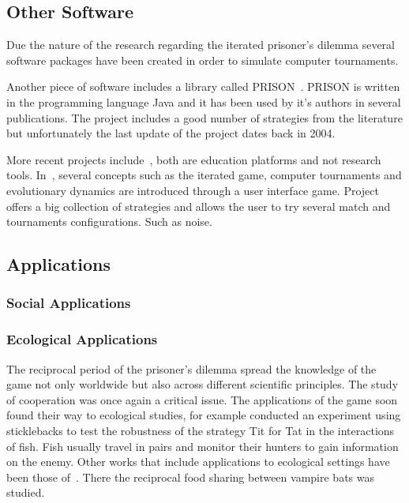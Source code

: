 \documentclass{article}
\begin{document}
\subsection{Other Software}

Due the nature of the research regarding the iterated prisoner's dilemma
several software packages have been created in order to simulate computer
tournaments.

Another piece of software includes a library called PRISON~\cite{prison}.
PRISON is written in the programming language Java and it has been used by it's authors
in several publications. The project includes a good number of strategies from
the literature but unfortunately the last update of the project dates back in 2004.

More recent projects include~\cite{pd_trust, pd_game}, both are education 
platforms and not research tools. In~\cite{pd_trust}, several concepts such as 
the iterated game, computer tournaments and evolutionary dynamics are introduced
through a user interface game. Project~\cite{pd_game} offers a big collection of
strategies and allows the user to try several match and tournaments configurations.
Such as noise. 

\subsection{Applications}

\subsubsection{Social Applications}

\subsubsection{Ecological Applications}

The reciprocal period of the prisoner's dilemma spread the knowledge of the
game not only worldwide but also across different scientific principles. The
study of cooperation was once again a critical issue. The applications of
the game soon found their way to ecological studies, for example 
\cite{Milinski1987} conducted an experiment using sticklebacks to test
the robustness of the strategy Tit for Tat in the interactions of fish. Fish usually
travel in pairs and monitor their hunters to gain information on the enemy.
Other works that include applications to ecological settings have been those
of~\cite{Godfray1992, Wilkinson1984}. There the reciprocal food sharing
between vampire bats was studied.
\end{document}
